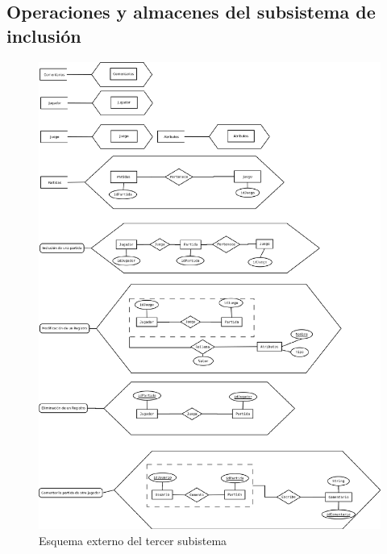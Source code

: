 \subsection{Operaciones y almacenes del subsistema de inclusión}
\begin{figure}[H]
  \centering
  \includegraphics[width=0.5\linewidth]{../Diagramas/pdf/EsquemaExternoInclusion.pdf}
  \caption{Esquema externo del tercer subistema}
\end{figure}
